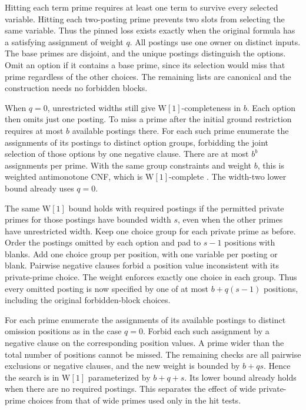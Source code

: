 Hitting each term prime requires at least one term
to survive every selected variable. Hitting each
two-posting prime prevents two slots from selecting
the same variable. Thus the pinned loss exists
exactly when the original formula has a satisfying
assignment of weight $q$. All postings use one
owner on distinct inputs. The base primes are
disjoint, and the unique postings distinguish the
options. Omit an option if it contains a base
prime, since its selection would miss that prime
regardless of the other choices. The remaining
lists are canonical and the construction needs
no forbidden blocks.

When $q=0$, unrestricted widths still give
$\mathrm W[1]$-completeness in $b$. Each option
then omits just one posting. To miss a prime
after the initial ground restriction requires
at most $b$ available postings there. For each
such prime enumerate the assignments of its
postings to distinct option groups, forbidding the
joint selection of those options by one negative
clause. There are at most $b^b$ assignments per
prime. With the same group constraints and weight
$b$, this is weighted antimonotone CNF, which is
$\mathrm W[1]$-complete \cite{KanjXia2011Normalized}.
The width-two lower bound already uses $q=0$.

The same $\mathrm W[1]$ bound holds with required
postings if the permitted private primes for those
postings have bounded width $s$, even when the
other primes have unrestricted width. Keep one
choice group for each private prime as before.
Order the postings omitted by each option and pad
to $s-1$ positions with blanks. Add one choice
group per position, with one variable per posting
or blank. Pairwise negative clauses forbid a
position value inconsistent with its private-prime
choice. The weight enforces exactly one choice
in each group. Thus every omitted posting is now
specified by one of at most $b+q(s-1)$ positions,
including the original forbidden-block choices.

For each prime enumerate the assignments of its
available postings to distinct omission positions
as in the case $q=0$. Forbid each such assignment
by a negative clause on the corresponding position
values. A prime wider than the total number of
positions cannot be missed. The remaining checks
are all pairwise exclusions or negative clauses,
and the new weight is bounded by $b+qs$. Hence
the search is in $\mathrm W[1]$ parameterized by
$b+q+s$. Its lower bound already holds when there
are no required postings. This separates the
effect of wide private-prime choices from that of
wide primes used only in the hit tests.


